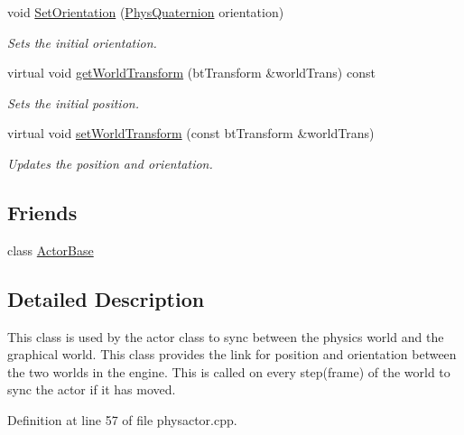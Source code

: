 \begin{DoxyCompactItemize}
void \hyperlink{classPhysMotionState_a1f8510490f7b4dfb0c85f4ffb6823305}{SetOrientation} (\hyperlink{classPhysQuaternion}{PhysQuaternion} orientation)
\begin{DoxyCompactList}\small\item\em Sets the initial orientation. \item\end{DoxyCompactList}\item 
virtual void \hyperlink{classPhysMotionState_ad7f6fc932da90cc2a718fbe809d95287}{getWorldTransform} (btTransform \&worldTrans) const 
\begin{DoxyCompactList}\small\item\em Sets the initial position. \item\end{DoxyCompactList}\item 
virtual void \hyperlink{classPhysMotionState_a57c23b922e2c5e8af87dc1318796ec8b}{setWorldTransform} (const btTransform \&worldTrans)
\begin{DoxyCompactList}\small\item\em Updates the position and orientation. \item\end{DoxyCompactList}\end{DoxyCompactItemize}
\subsection*{Friends}
\begin{DoxyCompactItemize}
\item 
\hypertarget{classPhysMotionState_ac09063d4b0192680ba3aa0bd4003a274}{
class \hyperlink{classPhysMotionState_ac09063d4b0192680ba3aa0bd4003a274}{ActorBase}}
\label{d2/d14/classPhysMotionState_ac09063d4b0192680ba3aa0bd4003a274}

\end{DoxyCompactItemize}


\subsection{Detailed Description}
This class is used by the actor class to sync between the physics world and the graphical world. This class provides the link for position and orientation between the two worlds in the engine. This is called on every step(frame) of the world to sync the actor if it has moved. 

Definition at line 57 of file physactor.cpp.

